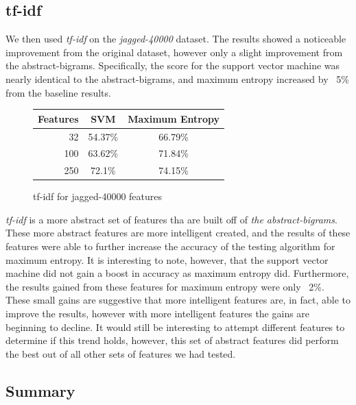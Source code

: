 \subsection{tf-idf}
We then used \emph{tf-idf} on the \emph{jagged-40000} dataset.  The results showed a noticeable improvement from the original dataset, however only a slight improvement from the abstract-bigrams.  Specifically, the score for the support vector machine was nearly identical to the abstract-bigrams, and maximum entropy increased by ~5\% from the baseline results.

\begin{figure}[!h]
\begin{center}
\caption{tf-idf for jagged-40000 features}
\begin{tabular}{| r | c | c |}
\hline
\textbf{Features} & \textbf{SVM} & \textbf{Maximum Entropy} \\ \hline
32 & 54.37\% & 66.79\% \\ \hline
100 & 63.62\% & 71.84\% \\ \hline
250 & 72.1\% & 74.15\% \\ \hline
\end{tabular}
\end{center}
\end{figure}

\emph{tf-idf} is a more abstract set of features tha are built off of \emph{the abstract-bigrams}.  These more abstract features are more intelligent created, and the results of these features were able to further increase the accuracy of the testing algorithm for maximum entropy.  It is interesting to note, however, that the support vector machine did not gain a boost in accuracy as maximum entropy did.  Furthermore, the results gained from these features for maximum entropy were only ~2\%.  These small gains are suggestive that more intelligent features are, in fact, able to improve the results, however with more intelligent features the gains are beginning to decline.  It would still be interesting to attempt different features to determine if this trend holds, however, this set of abstract features did perform the best out of all other sets of features we had tested.

\subsection{Summary}

